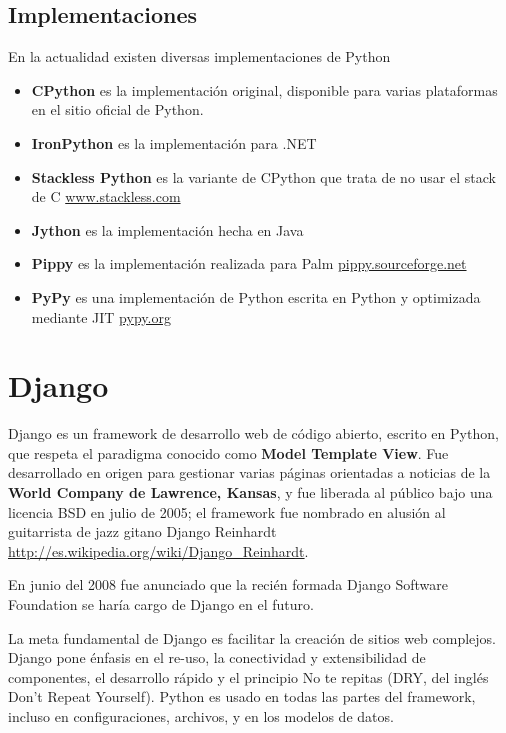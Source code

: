 \subsection{Implementaciones}

En la actualidad existen diversas implementaciones de Python

\begin{itemize}
    \item {\bfseries CPython} es la implementación original, disponible para varias plataformas en el sitio oficial de Python.
    \item {\bfseries IronPython} es la implementación para .NET
    \item {\bfseries Stackless Python} es la variante de CPython que trata de no usar el stack de C \url{www.stackless.com}
    \item {\bfseries Jython} es la implementación hecha en Java
    \item {\bfseries Pippy} es la implementación realizada para Palm \url{pippy.sourceforge.net}
    \item {\bfseries PyPy} es una implementación de Python escrita en Python y optimizada mediante JIT \url{pypy.org}
\end{itemize}


\section{Django}


Django es un framework de desarrollo web de código abierto, escrito en Python,
que respeta el paradigma conocido como {\bfseries Model Template View}. Fue desarrollado en
origen para gestionar varias páginas orientadas a noticias de la
{\bfseries World Company de Lawrence, Kansas}, y fue liberada al público bajo una licencia
BSD en julio de 2005; el framework fue nombrado en alusión al guitarrista de
jazz gitano Django Reinhardt \url{http://es.wikipedia.org/wiki/Django_Reinhardt}.

En junio del 2008 fue anunciado que la recién formada Django Software Foundation
se haría cargo de Django en el futuro.

La meta fundamental de Django es facilitar la creación de sitios web complejos.
Django pone énfasis en el re-uso, la conectividad y extensibilidad de
componentes, el desarrollo rápido y el principio No te repitas
(DRY, del inglés Don't Repeat Yourself). Python es usado en todas las partes
del framework, incluso en configuraciones, archivos, y en los modelos de datos.


